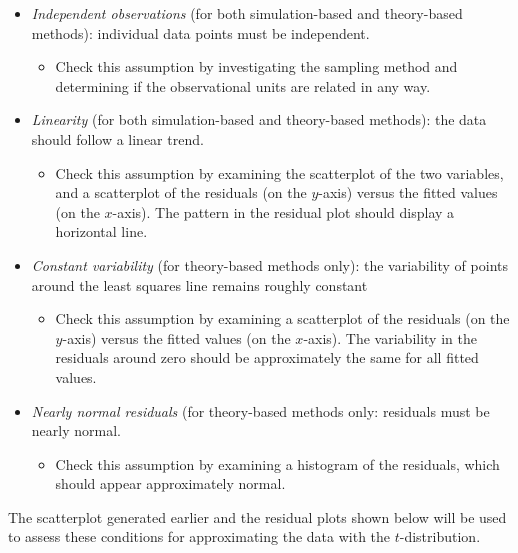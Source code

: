 \documentclass[
]{report}
\providecommand{\tightlist}{%
  \setlength{\itemsep}{0pt}\setlength{\parskip}{0pt}}
\begin{document}
\begin{itemize}
\tightlist
\item
  \emph{Independent observations} (for both simulation-based and theory-based methods): individual data points must be independent.

  \begin{itemize}
  \tightlist
  \item
    Check this assumption by investigating the sampling method and determining if the observational units are related in any way.
  \end{itemize}
\item
  \emph{Linearity} (for both simulation-based and theory-based methods): the data should follow a linear trend.

  \begin{itemize}
  \tightlist
  \item
    Check this assumption by examining the scatterplot of the two variables, and a scatterplot of the residuals (on the \(y\)-axis) versus the fitted values (on the \(x\)-axis). The pattern in the residual plot should display a horizontal line.
  \end{itemize}
\item
  \emph{Constant variability} (for theory-based methods only): the variability of points around the least squares line remains roughly constant

  \begin{itemize}
  \tightlist
  \item
    Check this assumption by examining a scatterplot of the residuals (on the \(y\)-axis) versus the fitted values (on the \(x\)-axis). The variability in the residuals around zero should be approximately the same for all fitted values.
  \end{itemize}
\item
  \emph{Nearly normal residuals} (for theory-based methods only: residuals must be nearly normal.

  \begin{itemize}
  \tightlist
  \item
    Check this assumption by examining a histogram of the residuals, which should appear approximately normal.
  \end{itemize}
\end{itemize}

The scatterplot generated earlier and the residual plots shown below will be used to assess these conditions for approximating the data with the \(t\)-distribution.
\end{document}
